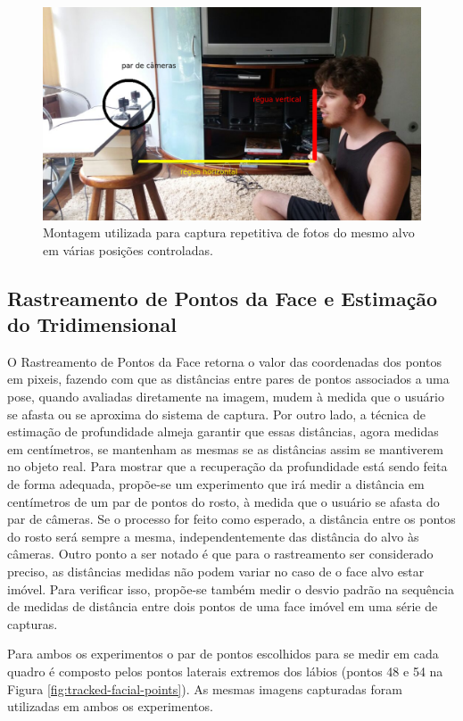 \begin{figure}
\centering
\includegraphics[width=0.8\linewidth]{figs/setupExperimento-comentado.png}
\caption{Montagem utilizada para captura repetitiva de fotos do mesmo alvo em várias posições controladas.}
\label{fig:exp-montagem}
\end{figure}

\subsection{Rastreamento de Pontos da Face e Estimação do Tridimensional}

O Rastreamento de Pontos da Face retorna o valor das coordenadas dos pontos em pixeis, fazendo com que as distâncias entre pares de pontos associados a uma pose, quando avaliadas diretamente na imagem, mudem à medida que o usuário se afasta ou se aproxima do sistema de captura. Por outro lado, a técnica de estimação de profundidade almeja garantir que essas distâncias, agora medidas em centímetros, se mantenham as mesmas se as distâncias assim se mantiverem no objeto real. Para mostrar que a recuperação da profundidade está sendo feita de forma adequada, propõe-se um experimento que irá medir a distância em centímetros de um par de pontos do rosto, à medida que o usuário se afasta do par de câmeras. Se o processo for feito como esperado, a distância entre os pontos do rosto será sempre a mesma, independentemente das distância do alvo às câmeras.  Outro ponto a ser notado é que para o rastreamento ser considerado preciso, as distâncias medidas não podem variar no caso de o face alvo estar imóvel. Para verificar isso, propõe-se também medir o desvio padrão na sequência de medidas de distância entre dois pontos de uma face imóvel em uma série de capturas.


Para ambos os experimentos o par de pontos escolhidos para se medir em cada quadro é composto pelos pontos laterais extremos dos lábios (pontos 48 e 54 na Figura \ref{fig:tracked-facial-points}). As mesmas imagens capturadas foram utilizadas em ambos os experimentos.

